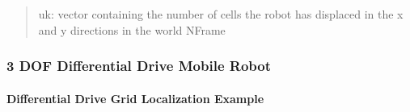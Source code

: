 \documentclass[letterpaper,10pt,english]{sphinxmanual}
\begin{document}
\begin{fulllineitems}
\begin{fulllineitems}
\begin{quote}
\begin{description}
\sphinxAtStartPar
uk: vector containing the number of cells the robot has displaced in the x and y directions in the world N\sphinxhyphen{}Frame

\end{description}\end{quote}

\end{fulllineitems}


\end{fulllineitems}



\subsubsection{3 DOF Differential Drive Mobile Robot}
\label{\detokenize{GridLocalization:dof-differential-drive-mobile-robot}}

\paragraph{Differential Drive Grid Localization Example}
\label{\detokenize{GridLocalization:differential-drive-grid-localization-example}}
\begin{figure}[htbp]
\centering

\noindent{}
\end{figure}
\end{document}
